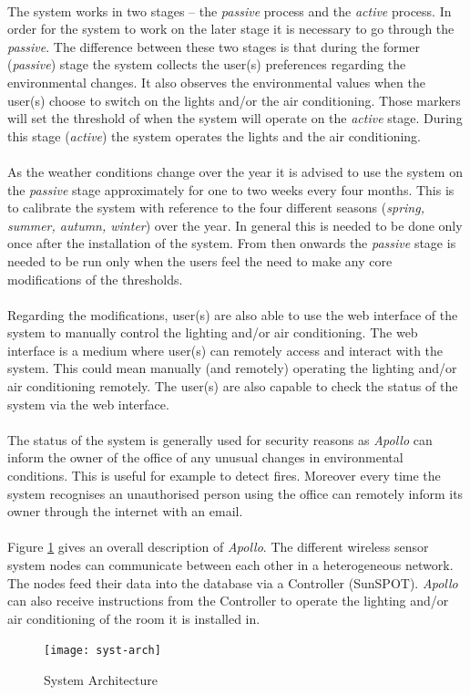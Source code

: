 \documentclass[12pt,a4paper]{report}
\begin{document}
\ \\
The system works in two stages -- the \emph{passive} process and the \emph{active} process.
In order for the system to work on the later stage it is necessary to go through the \emph{passive}.
The difference between these two stages is that during the former (\emph{passive}) stage the system collects the user(s) preferences regarding the environmental changes.
It also observes the environmental values when the user(s) choose to switch on the lights and/or the air conditioning.
Those markers will set the threshold of when the system will operate on the \emph{active} stage.
During this stage (\textit{active}) the system operates the lights and the air conditioning.\\
\ \\
As the weather conditions change over the year it is advised to use the system on the \emph{passive} stage approximately for one to two weeks every four months. This is to calibrate the system with reference to the four different seasons (\textit{spring, summer, autumn, winter}) over the year. In general this is needed to be done only once after the installation of the system. From then onwards the \emph{passive} stage is needed to be run only when the users feel the need to make any core modifications of the thresholds.\\
\ \\
Regarding the modifications, user(s) are also able to use the web interface of the system to manually control the lighting and/or air conditioning. The web interface is a medium where user(s) can remotely access and interact with the system. This could mean manually (and remotely) operating the lighting and/or air conditioning remotely. The user(s) are also capable to check the status of the system via the web interface.\\
\ \\
The status of the system is generally used for security reasons as \emph{Apollo} can inform the owner of the office of any unusual changes in environmental conditions. This is useful for example to detect fires. Moreover every time the system recognises an unauthorised person using the office can remotely inform its owner through the internet with an email.\\
\ \\
Figure \ref{syst-arch} gives an overall description of \emph{Apollo}. The different wireless sensor system nodes can communicate between each other in a heterogeneous network.
The nodes feed their data into the database via a Controller (SunSPOT).
\emph{Apollo} can also receive instructions from the Controller to operate the lighting and/or air conditioning of the room it is installed in.
\ \\
\begin{figure}[H]
\centering
\texttt{[image: syst-arch]}
\caption{System Architecture}
\label{syst-arch}
\end{figure}
\ \\
%
\newpage
%
\end{document}
